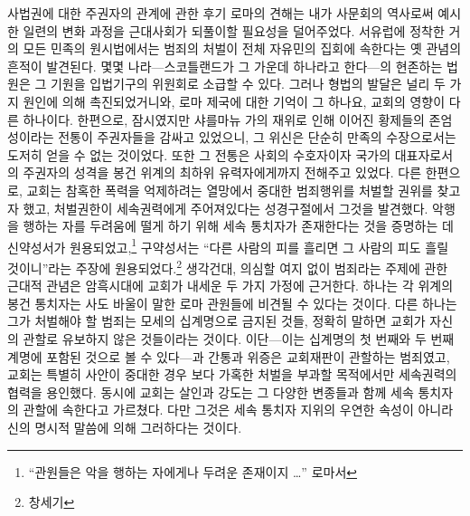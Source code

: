 사법권에 대한 주권자의 관계에 관한 후기 로마의 견해는
내가 사문회의 역사로써 예시한 일련의 변화 과정을
근대사회가
되풀이할 필요성을 덜어주었다.
서유럽에 정착한 거의 모든 민족의 원시법에서는
범죄의 처벌이 전체 자유민의 집회에 속한다는 옛 관념의 흔적이 발견된다.
몇몇 나라---스코틀랜드가 그 가운데 하나라고 한다---의
현존하는 법원은 그 기원을 입법기구의 위원회로 소급할 수 있다.
그러나 형법의 발달은 널리 두 가지 원인에 의해 촉진되었거니와,
로마 제국에 대한 기억이 그 하나요,
교회의 영향이 다른 하나이다.
한편으로,
잠시였지만 샤를마뉴 가의 재위로 인해 이어진
황제들의 존엄성이라는 전통이 주권자들을 감싸고 있었으니,
그 위신은 단순히 만족의 수장으로서는 도저히 얻을 수 없는 것이었다.
또한 그 전통은
사회의 수호자이자 국가의 대표자로서의 주권자의 성격을
봉건 위계의 최하위 유력자에게까지
전해주고 있었다.
다른 한편으로,
교회는
참혹한 폭력을 억제하려는 열망에서
중대한 범죄행위를 처벌할 권위를 찾고자 했고,
처벌권한이 세속권력에게 주어져있다는 성경구절에서 그것을 발견했다.
악행을 행하는 자를 두려움에 떨게 하기 위해
세속 통치자가 존재한다는 것을 증명하는 데
신약성서가 원용되었고,\footnote{%
  ``관원들은 악을 행하는 자에게나 두려운 존재이지 \ldots''
  로마서 }
구약성서는 ``다른 사람의 피를 흘리면 그 사람의 피도 흘릴 것이니''라는
주장에 원용되었다.\footnote{%
  창세기 }
생각건대,
의심할 여지 없이
범죄라는 주제에 관한 근대적 관념은
암흑시대에 교회가 내세운 두 가지 가정에 근거한다.
하나는
각 위계의 봉건 통치자는 사도 바울이 말한
로마 관원들에 비견될 수 있다는 것이다.
다른 하나는
그가 처벌해야 할 범죄는
모세의 십계명으로 금지된 것들,
정확히 말하면 교회가 자신의 관할로 유보하지 않은 것들이라는 것이다.
이단---이는 십계명의 첫 번째와 두 번째 계명에
포함된 것으로 볼 수 있다---과 간통과 위증은
교회재판이 관할하는 범죄였고,
%
교회는
특별히 사안이 중대한 경우
보다 가혹한 처벌을 부과할 목적에서만
세속권력의 협력을 용인했다.
동시에
교회는
살인과 강도는
그 다양한 변종들과 함께
세속 통치자의 관할에 속한다고 가르쳤다.
다만 그것은 세속 통치자 지위의 우연한 속성이 아니라
신의 명시적 말씀에 의해 그러하다는 것이다.

